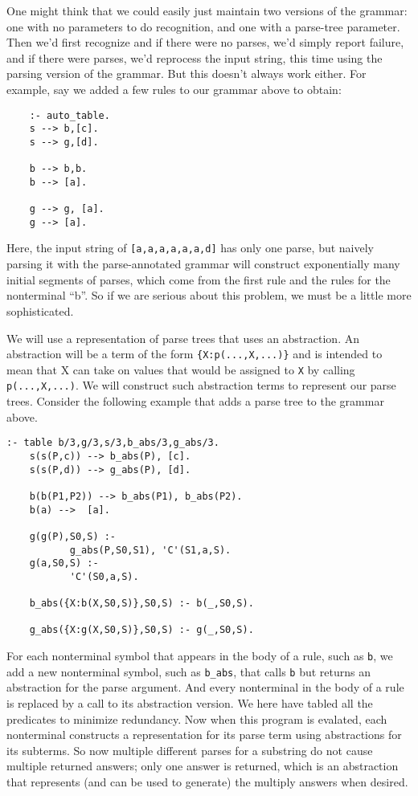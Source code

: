One might think that we could easily just maintain two versions of the
grammar: one with no parameters to do recognition, and one with a
parse-tree parameter.  Then we'd first recognize and if there were no
parses, we'd simply report failure, and if there were parses, we'd
reprocess the input string, this time using the parsing version of the
grammar.  But this doesn't always work either.  For example, say we
added a few rules to our grammar above to obtain:
\begin{verbatim}
    :- auto_table.
    s --> b,[c].
    s --> g,[d].

    b --> b,b.
    b --> [a].

    g --> g, [a].
    g --> [a].
\end{verbatim}
Here, the input string of \verb|[a,a,a,a,a,a,d]| has only one parse,
but naively parsing it with the parse-annotated grammar will construct
exponentially many initial segments of parses, which come from the
first rule and the rules for the nonterminal ``b''.  So if we are
serious about this problem, we must be a little more sophisticated.

We will use a representation of parse trees that uses an abstraction.
An abstraction will be a term of the form \verb|{X:p(...,X,...)}| and
is intended to mean that X can take on values that would be assigned
to \verb|X| by calling \verb|p(...,X,...)|.  We will construct such
abstraction terms to represent our parse trees.  Consider the
following example that adds a parse tree to the grammar above.
\begin{verbatim}
:- table b/3,g/3,s/3,b_abs/3,g_abs/3.
    s(s(P,c)) --> b_abs(P), [c].
    s(s(P,d)) --> g_abs(P), [d].

    b(b(P1,P2)) --> b_abs(P1), b_abs(P2).
    b(a) -->  [a].

    g(g(P),S0,S) :- 
           g_abs(P,S0,S1), 'C'(S1,a,S).
    g(a,S0,S) :- 
           'C'(S0,a,S).

    b_abs({X:b(X,S0,S)},S0,S) :- b(_,S0,S).

    g_abs({X:g(X,S0,S)},S0,S) :- g(_,S0,S).
\end{verbatim}
For each nonterminal symbol that appears in the body of a rule, such
as \verb|b|, we add a new nonterminal symbol, such as \verb|b_abs|,
that calls \verb|b| but returns an abstraction for the parse argument.
And every nonterminal in the body of a rule is replaced by a call to
its abstraction version.  We here have tabled all the predicates to
minimize redundancy.  Now when this program is evalated, each
nonterminal constructs a representation for its parse term using
abstractions for its subterms.  So now multiple different parses for a
substring do not cause multiple returned answers; only one answer is
returned, which is an abstraction that represents (and can be used to
generate) the multiply answers when desired.

